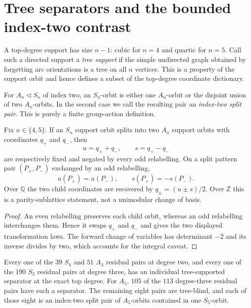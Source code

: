 \section{Tree separators and the bounded index-two contrast}
\label{sec:tree-index-two}

A top-degree support has size $n-1$: cubic for $n=4$ and quartic for $n=5$.
Call such a directed support a \emph{tree support} if the simple undirected
graph obtained by forgetting arc orientations is a tree on all $n$ vertices.
This is a property of the support orbit and hence defines a subset of the
top-degree coordinate dictionary.

For $A_n\triangleleft S_n$ of index two, an $S_n$-orbit is either one
$A_n$-orbit or the disjoint union of two $A_n$-orbits.  In the second case we
call the resulting pair an \emph{index-two split pair}.  This is purely a
finite group-action definition.

\begin{lemma}
\label{lem:index-two-channels}
Fix $n\in\{4,5\}$.  If an $S_n$ support orbit splits into two $A_n$ support
orbits with coordinates $q_+$ and $q_-$, then
\[
  u=q_++q_-,\qquad s=q_+-q_-
\]
are respectively fixed and negated by every odd relabelling.  On a split
pattern pair $(P_+,P_-)$ exchanged by an odd relabelling,
\[
  u(P_+)=u(P_-),\qquad s(P_+)=-s(P_-).
\]
Over $\mathbb Q$ the two child coordinates are recovered by
$q_\pm=(u\pm s)/2$.  Over $\mathbb Z$ this is a parity-sublattice statement,
not a unimodular change of basis.
\end{lemma}

\begin{proof}
An even relabelling preserves each child orbit, whereas an odd relabelling
interchanges them.  Hence it swaps $q_+$ and $q_-$ and gives the two displayed
transformation laws.  The forward change of variables has determinant $-2$
and its inverse divides by two, which accounts for the integral caveat.
\end{proof}

\begin{proposition}
\label{prop:tree-index-two}
Every one of the $39$ $S_4$ and $51$ $A_4$ residual pairs at degree two, and
every one of the $190$ $S_5$ residual pairs at degree three, has an individual
tree-supported separator at the exact top degree.  For $A_5$, $105$ of the
$113$ degree-three residual pairs have such a separator.  The remaining eight
pairs are tree-blind, and each of those eight is an index-two split pair of
$A_5$-orbits contained in one $S_5$-orbit.
\end{proposition}

